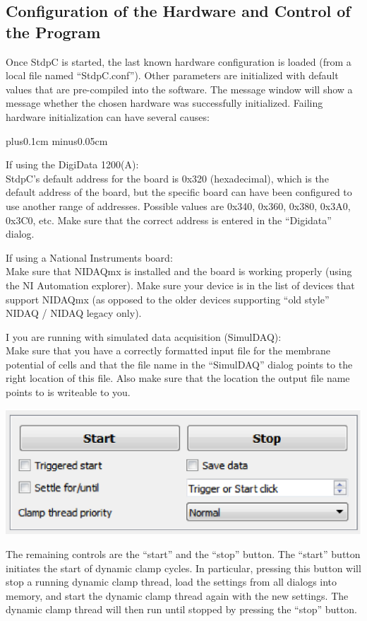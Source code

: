 \documentclass{article}
\makeatletter
\newenvironment{myenum}{
\begin{list}{\labelenumi}{\setlength{\leftmargin}{1.3em}
  \setcounter{enumi}{0}
  \renewcommand{\item}{\addtocounter{enumi}{1}\unskip \vspace{-0.1cm}\@inmatherr\item
  \@ifnextchar [\@item{\@noitemargtrue \@item[\@itemlabel]} \unskip}}
  \itemsep0.1cm plus0.1cm minus0.05cm
  \listparindent0cm
  \setlength{\labelsep}{0.5em}
  \setlength{\labelwidth}{0.8em}}
{\end{list}}
\makeatother
\begin{document}
\subsection{Configuration of the Hardware and Control of the Program}
Once StdpC is started, the last known hardware
configuration is loaded (from a local file named
``StdpC.conf''). Other parameters are initialized with default
values that are pre-compiled into the software. The message window
will show a message whether the chosen hardware was successfully
initialized.
Failing hardware initialization can have several causes: \\[-0.2cm]
\begin{myenum}
\item If using the DigiData 1200(A): \\
StdpC's default address for the board is 0x320 (hexadecimal), which
is the default address of the board, but the specific board can have been
configured to use another range of addresses. Possible values are 0x340,
0x360, 0x380, 0x3A0, 0x3C0, etc. Make sure that the correct address is
entered in the ``Digidata'' dialog.
\item If using a National Instruments board: \\
Make sure that NIDAQmx is installed and the board is working properly
(using the NI Automation explorer). Make sure your device is in the
list of devices that support NIDAQmx (as opposed to the older devices
supporting ``old style'' NIDAQ / NIDAQ legacy only).
\item I you are running with simulated data acquisition (SimulDAQ): \\
Make sure that you have a correctly formatted input file for the
membrane potential of cells and that the file name in the ``SimulDAQ''
dialog points to the right location of this file. Also make sure that the
location the output file name points to is writeable to you.
\end{myenum}

\noindent
\parbox{0.45\textwidth}{
	\includegraphics[scale=0.5]{runctrl}
} \hfill
\parbox{0.53\textwidth}{The remaining controls are the ``start'' and the ``stop'' button.  The
``start'' button initiates the start of dynamic clamp cycles. In
particular, pressing this button will stop a running dynamic clamp
thread, load the settings from all dialogs into memory, and
start the dynamic clamp thread again with the new settings. The
dynamic clamp thread will then run until stopped by pressing the
``stop'' button.
} \\
\end{document}
